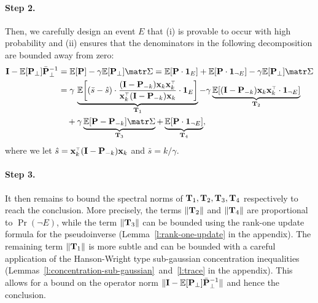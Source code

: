 \documentclass[../../thesis.tex]{subfiles}
\begin{document}
\paragraph{Step 2.} Then, we carefully design an event $E$ that (i)
is provable to occur with high probability and (ii) ensures that the
denominators in the following decomposition are bounded away from
zero:
\begin{align*}
  \I-\E[\P_\perp]\bar\P_\perp^{-1}
   & = \E[\P] - \gamma\E[\P_\perp]\Sigmab = \E[\P \cdot \one_E] +
  \E[\P  \cdot \one_{\neg E}]
  -\gamma\E[\P_\perp]\Sigmab                                                                                   \\
   & =\gamma\,\underbrace{\E\bigg[(\bar s-\hat
      s)\cdot\frac{(\I -\P_{-k})\x_k\x_k^\top}{\x_k^\top(\I -\P_{-k})\x_k} \cdot \one_E\bigg]}_{\T_1}
  - \gamma \underbrace{\E[ (\I - \P_{-k}) \x_k\x_k^\top \cdot \one_{\neg E}]}_{\T_2}                           \\
   & \quad+ \gamma \underbrace{\E[\P-\P_{-k}]\Sigmab}_{\T_3} + \underbrace{\E[\P \cdot \one_{\neg E}]}_{\T_4},
\end{align*}
where we let $\hat s = \x_k^\top(\I - \P_{-k})\x_k$ and $\bar s=k/\gamma$.
\paragraph{Step 3.}
It then remains to bound the spectral norms of $ \mathbf{T}_1, \mathbf{T}_2, \mathbf{T}_3
  ,\mathbf{T}_4$ respectively to reach the conclusion. More precisely, the terms
$\| \mathbf{T}_2 \| $ and $\| \mathbf{T}_4 \|$ are proportional to $\Pr (\neg E)$,
while the term $\| \mathbf{T}_3 \|$ can be bounded using the rank-one update
formula for the pseudoinverse (Lemma~\ref{l:rank-one-update} in the
appendix). The remaining term $\| \mathbf{T}_1 \|$ is more subtle and can be
bounded with a careful application of  the Hanson-Wright type
\citep{rudelson2013hanson} sub-gaussian concentration
inequalities (Lemmas~\ref{l:concentration-sub-gaussian}~and~\ref{l:trace} in the
appendix). This allows for a bound on the operator norm $\| \mathbf I -
  \mathbb E[\mathbf P_\perp ] \bar {\mathbf P}_\perp^{-1}\| $ and hence the conclusion.
\end{document}
